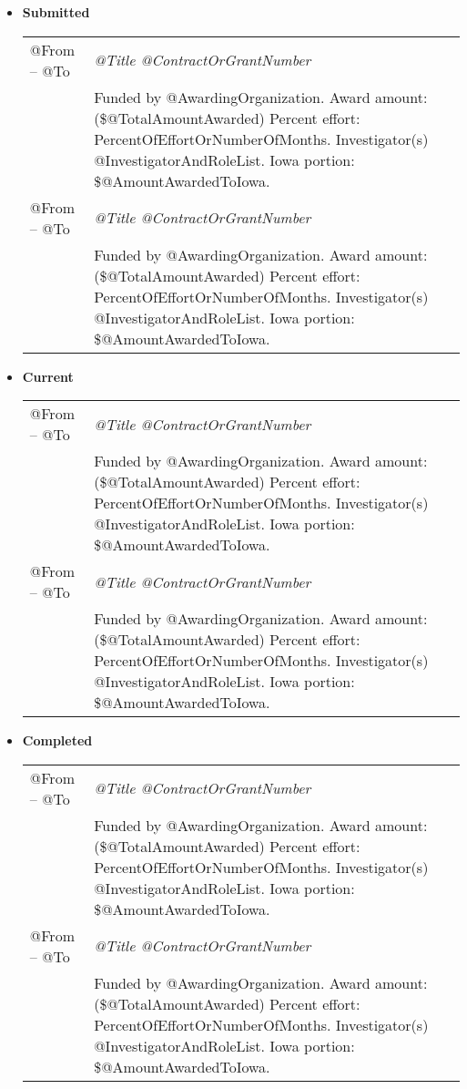 \documentclass[10pt]{article}
\begin{document}
\begin{itemize}
\item[] \textbf{Submitted}
\\[1.3ex]
\begin{tabular}{l@{\quad\ }p{34em}} 
 @From -- @To 
 & \emph{@Title @ContractOrGrantNumber} \\
 & Funded by @AwardingOrganization. 
   Award amount: (\$@TotalAmountAwarded) 
   Percent effort: PercentOfEffortOrNumberOfMonths. 
   Investigator(s) @InvestigatorAndRoleList. 
   Iowa portion: \$@AmountAwardedToIowa.
   \smallskip \\
 @From -- @To 
 & \emph{@Title @ContractOrGrantNumber} \\
 & Funded by @AwardingOrganization. 
   Award amount: (\$@TotalAmountAwarded) 
   Percent effort: PercentOfEffortOrNumberOfMonths. 
   Investigator(s) @InvestigatorAndRoleList. 
   Iowa portion: \$@AmountAwardedToIowa.
\end{tabular}

\item[] \textbf{Current}
\\[1.3ex]
\begin{tabular}{l@{\quad\ }p{34em}} 
 @From -- @To 
 & \emph{@Title @ContractOrGrantNumber} \\
 & Funded by @AwardingOrganization. 
   Award amount: (\$@TotalAmountAwarded) 
   Percent effort: PercentOfEffortOrNumberOfMonths. 
   Investigator(s) @InvestigatorAndRoleList. 
   Iowa portion: \$@AmountAwardedToIowa.
   \smallskip \\
 @From -- @To 
 & \emph{@Title @ContractOrGrantNumber} \\
 & Funded by @AwardingOrganization. 
   Award amount: (\$@TotalAmountAwarded) 
   Percent effort: PercentOfEffortOrNumberOfMonths. 
   Investigator(s) @InvestigatorAndRoleList. 
   Iowa portion: \$@AmountAwardedToIowa.
\end{tabular}

\item[] \textbf{Completed}
\\[1.3ex]
\begin{tabular}{l@{\quad\ }p{34em}} 
 @From -- @To 
 & \emph{@Title @ContractOrGrantNumber} \\
 & Funded by @AwardingOrganization. 
   Award amount: (\$@TotalAmountAwarded) 
   Percent effort: PercentOfEffortOrNumberOfMonths. 
   Investigator(s) @InvestigatorAndRoleList. 
   Iowa portion: \$@AmountAwardedToIowa.
   \smallskip \\
 @From -- @To 
 & \emph{@Title @ContractOrGrantNumber} \\
 & Funded by @AwardingOrganization. 
   Award amount: (\$@TotalAmountAwarded) 
   Percent effort: PercentOfEffortOrNumberOfMonths. 
   Investigator(s) @InvestigatorAndRoleList. 
   Iowa portion: \$@AmountAwardedToIowa.
\end{tabular}


\end{itemize}
\end{document}

